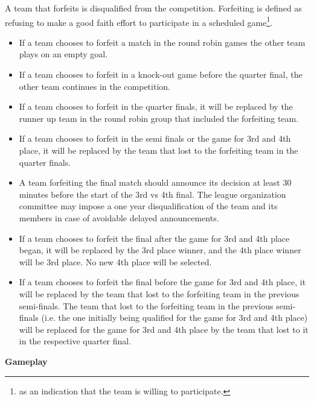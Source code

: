A team that forfeits is disqualified from the competition. Forfeiting is defined as refusing to make a good faith effort to participate in a scheduled game\footnote{  as an indication that the team is willing to participate.}.
\begin{itemize}
\item If a team chooses to forfeit a match in the round robin games the other team plays on an empty goal.
\item If a team chooses to forfeit in a knock-out game before the quarter final, the other team continues in the competition.
\item If a team chooses to forfeit in the quarter finals, it will be replaced by the runner up team in the round robin group that included the forfeiting team.
\item If a team chooses to forfeit in the semi finals or the game for 3rd and 4th place, it will be replaced by the team that lost to the forfeiting team in the quarter finals.
\item A team forfeiting the final match should announce its decision at least 30 minutes before the start of the 3rd vs 4th final.  The league organization committee may impose a one year disqualification of the team and its members in case of avoidable delayed announcements.
\item If a team chooses to forfeit the final after the game for 3rd and 4th place began, it will be replaced by the 3rd place winner, and the 4th place winner will be 3rd place. No new 4th place will be selected.
\item If a team chooses to forfeit the final before the game for 3rd and 4th place, it will be replaced by the team that lost to the forfeiting team in the previous semi-finals. The team that lost to the forfeiting team in the previous semi-finals (i.e. the one initially being qualified for the game for 3rd and 4th place) will be replaced for the game for 3rd and 4th place by the team that lost to it in the respective quarter final.
\end{itemize}

\clearpage
{\bfseries Gameplay}

\headlinebox


